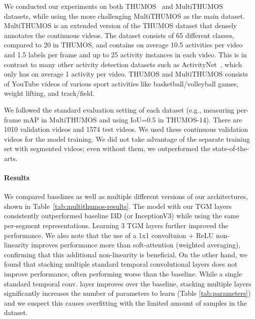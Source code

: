 \documentclass{article}
\begin{document}
We conducted our experiments on both THUMOS~\citep{THUMOS14} and MultiTHUMOS~\citep{yeung2015every} datasets, while using the more challenging MultiTHUMOS as the main dataset. MultiTHUMOS is an extended version of the THUMOS dataset that densely annotates the continuous videos. The dataset consists of 65 different classes, compared to 20 in THUMOS, and contains on average 10.5 activities per video and 1.5 labels per frame and up to 25 activity instances in each video. This is in contrast to many other activity detection datasets such as ActivityNet~\citep{caba2015activitynet}, which only has on average 1 activity per video. THUMOS and MultiTHUMOS consists of YouTube videos of various sport activities like basketball/volleyball games, weight lifting, and track/field.

We followed the standard evaluation setting of each dataset (e.g., measuring per-frame mAP in MultiTHUMOS and using IoU=0.5 in THUMOS-14). There are 1010 validation videos and 1574 test videos. We used these continuous validation videos for the model training. We did not take advantage of the separate training set with segmented videos; even without them, we outperformed the state-of-the-arts.

\vspace{-4pt}
\paragraph{Results}
We compared baselines as well as multiple different versions of our architectures, shown in Table~\ref{tab:multithumos-results}. 
The model with our TGM layers consistently outperformed baseline I3D (or InceptionV3) while using the same per-segment representations.
Learning 3 TGM layers further improved the performance. We also note that the use of a 1x1 convoltuion + ReLU non-linearity improves performance more than soft-attention (weighted averaging), confirming that this additional non-linearity is beneficial. On the other hand, we found that stacking multiple standard temporal convolutional layers does not improve performance, often performing worse than the baseline. While a single standard temporal conv. layer improves over the baseline, stacking multiple layers significantly increases the number of parameters to learn (Table \ref{tab:parameters}) and we suspect this causes overfitting with the limited amount of samples in the dataset.
\end{document}
